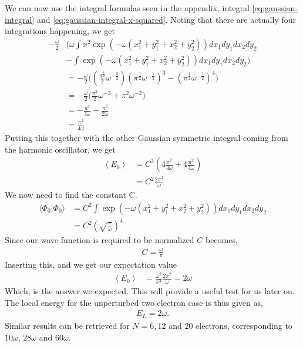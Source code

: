 \documentclass[11pt]{article}
\newcommand{\expect}[1]{\left\langle{#1}\right\rangle}
\begin{document}
We can now use the integral formulas seen in the appendix, integral \eqref{eq:gaussian-integral} and \eqref{eq:gaussian-integral-x-squared}. Noting that there are actually four integrations happening, we get
\begin{align*}
	-\frac{\omega}{2}&\bigg( \omega \int x^2 \exp \left(-\omega\left(x_1^2 + y_1^2 + x_2^2 + y_2^2\right)\right) dx_1 dy_1 dx_2 dy_2 \\
	&- \int \exp \left(-\omega\left(x_1^2 + y_1^2 + x_2^2 + y_2^2\right)\right) dx_1 dy_1 dx_2 dy_2 \bigg) \\
	&= -\frac{\omega}{2}\bigg( \left(\frac{\pi^\frac{1}{2}}{2}\omega^{-\frac{3}{2}}\right)\left(\pi^\frac{1}{2} \omega^{-\frac{1}{2}}\right)^3 - \left(\pi^\frac{1}{2} \omega^{-\frac{1}{2}}\right)^4\bigg) \\
	&= -\frac{\omega}{2}\bigg( \frac{\pi^2}{2}\omega^{-3} + \pi^2\omega^{-2} \bigg) \\
	&= -\frac{\pi^2}{4\omega} + \frac{\pi^2}{2\omega} \\
	&= \frac{\pi^2}{4\omega}
\end{align*}
Putting this together with the other Gaussian symmetric integral coming from the harmonic oscillator, we get
\begin{align*}
	\expect{E_0} &= C^2\left( 4\frac{\pi^2}{4\omega} + 4\frac{\pi^2}{4\omega} \right) \\
	&= C^2 \frac{2\pi^2}{\omega}
\end{align*}
We now need to find the constant C.
\begin{align*}
	\langle \Phi_0 | \Phi_0\rangle &= C^2\int\exp \left( -\omega\left(x_1^2 + y_1^2 + x_2^2 + y_2^2\right) \right) dx_1dy_1dx_2dy_2 \\
	&= C^2\left( \sqrt{\frac{\pi}{\omega}} \right)^4
\end{align*}
Since our wave function is required to be normalized $C$ becomes,
\begin{align*}
	C = \frac{\omega}{\pi}
\end{align*}
Inserting this, and we get our expectation value
\begin{align*}
	\expect{E_0} &= \frac{\omega^2}{\pi^2}\frac{2\pi^2}{\omega} = 2\omega
\end{align*}
Which, is the answer we expected. This will provide a useful test for us later on. The local energy for the unperturbed two electron case is thus given as,
\begin{align}
	E_L = 2\omega
	\label{eq:two-electron-local-energy-unperturbed}.
\end{align}
Similar results can be retrieved for $N=6, 12$ and $20$ electrons, corresponding to $10\omega$, $28\omega$ and $60\omega$.
\end{document}
